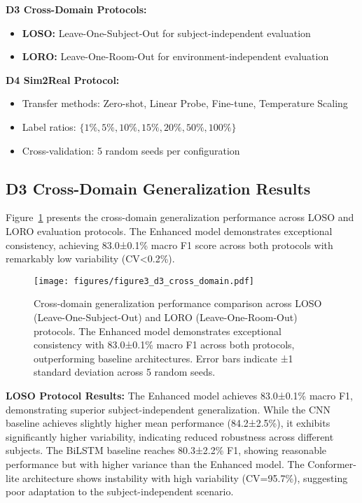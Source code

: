 \documentclass[journal]{IEEEtran}
\begin{document}
\textbf{D3 Cross-Domain Protocols:}
\begin{itemize}
\item \textbf{LOSO:} Leave-One-Subject-Out for subject-independent evaluation
\item \textbf{LORO:} Leave-One-Room-Out for environment-independent evaluation
\end{itemize}

\textbf{D4 Sim2Real Protocol:}
\begin{itemize}
\item Transfer methods: Zero-shot, Linear Probe, Fine-tune, Temperature Scaling
\item Label ratios: $\{1\%, 5\%, 10\%, 15\%, 20\%, 50\%, 100\%\}$
\item Cross-validation: 5 random seeds per configuration
\end{itemize}

\subsection{D3 Cross-Domain Generalization Results}

Figure~\ref{fig:cross_domain} presents the cross-domain generalization performance across LOSO and LORO evaluation protocols. The Enhanced model demonstrates exceptional consistency, achieving 83.0±0.1\% macro F1 score across both protocols with remarkably low variability (CV<0.2\%).

\begin{figure}[ht]
\centering
\texttt{[image: figures/figure3\_d3\_cross\_domain.pdf]}
\caption{Cross-domain generalization performance comparison across LOSO (Leave-One-Subject-Out) and LORO (Leave-One-Room-Out) protocols. The Enhanced model demonstrates exceptional consistency with 83.0±0.1\% macro F1 across both protocols, outperforming baseline architectures. Error bars indicate ±1 standard deviation across 5 random seeds.}
\label{fig:cross_domain}
\end{figure}

\textbf{LOSO Protocol Results:} The Enhanced model achieves 83.0±0.1\% macro F1, demonstrating superior subject-independent generalization. While the CNN baseline achieves slightly higher mean performance (84.2±2.5\%), it exhibits significantly higher variability, indicating reduced robustness across different subjects. The BiLSTM baseline reaches 80.3±2.2\% F1, showing reasonable performance but with higher variance than the Enhanced model. The Conformer-lite architecture shows instability with high variability (CV=95.7\%), suggesting poor adaptation to the subject-independent scenario.
\end{document}
